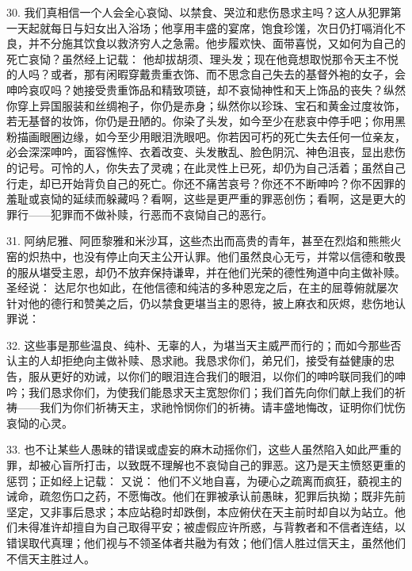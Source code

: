 30. 我们真相信一个人会全心哀恸、以禁食、哭泣和悲伤恳求主吗？这人从犯罪第一天起就每日与妇女出入浴场；他享用丰盛的宴席，饱食珍馐，次日仍打嗝消化不良，并不分施其饮食以救济穷人之急需。他步履欢快、面带喜悦，又如何为自己的死亡哀恸？虽然经上记载：  他却拔胡须、理头发；现在他竟想取悦那令天主不悦的人吗？或者，那有闲暇穿戴贵重衣饰、而不思念自己失去的基督外袍的女子，会呻吟哀叹吗？她接受贵重饰品和精致项链，却不哀恸神性和天上饰品的丧失？纵然你穿上异国服装和丝绸袍子，你仍是赤身；纵然你以珍珠、宝石和黄金过度妆饰，若无基督的妆饰，你仍是丑陋的。你染了头发，如今至少在悲哀中停手吧；你用黑粉描画眼圈边缘，如今至少用眼泪洗眼吧。你若因可朽的死亡失去任何一位亲友，必会深深呻吟，面容憔悴、衣着改变、头发散乱、脸色阴沉、神色沮丧，显出悲伤的记号。可怜的人，你失去了灵魂；在此灵性上已死，却仍为自己活着；虽然自己行走，却已开始背负自己的死亡。你还不痛苦哀号？你还不不断呻吟？你不因罪的羞耻或哀恸的延续而躲藏吗？看啊，这些是更严重的罪恶创伤；看啊，这是更大的罪行——犯罪而不做补赎，行恶而不哀恸自己的恶行。\par

31. 阿纳尼雅、阿匝黎雅和米沙耳，这些杰出而高贵的青年，甚至在烈焰和熊熊火窑的炽热中，也没有停止向天主公开认罪。他们虽然良心无亏，并常以信德和敬畏的服从堪受主恩，却仍不放弃保持谦卑，并在他们光荣的德性殉道中向主做补赎。圣经说： 达尼尔也如此，在他信德和纯洁的多种恩宠之后，在主的屈尊俯就屡次针对他的德行和赞美之后，仍以禁食更堪当主的恩待，披上麻衣和灰烬，悲伤地认罪说： \par

32. 这些事是那些温良、纯朴、无辜的人，为堪当天主威严而行的；而如今那些否认主的人却拒绝向主做补赎、恳求祂。我恳求你们，弟兄们，接受有益健康的忠告，服从更好的劝诫，以你们的眼泪连合我们的眼泪，以你们的呻吟联同我们的呻吟；我们恳求你们，为使我们能恳求天主宽恕你们；我们首先向你们献上我们的祈祷——我们为你们祈祷天主，求祂怜悯你们的祈祷。请丰盛地悔改，证明你们忧伤哀恸的心灵。\par

33. 也不让某些人愚昧的错误或虚妄的麻木动摇你们，这些人虽然陷入如此严重的罪，却被心盲所打击，以致既不理解也不哀恸自己的罪恶。这乃是天主愤怒更重的惩罚；正如经上记载： 又说：  他们不义地自喜，为硬心之疏离而疯狂，藐视主的诫命，疏忽伤口之药，不愿悔改。他们在罪被承认前愚昧，犯罪后执拗；既非先前坚定，又非事后恳求；本应站稳时却跌倒，本应俯伏在天主前时却自以为站立。他们未得准许却擅自为自己取得平安；被虚假应许所惑，与背教者和不信者连结，以错误取代真理；他们视与不领圣体者共融为有效；他们信人胜过信天主，虽然他们不信天主胜过人。\par

